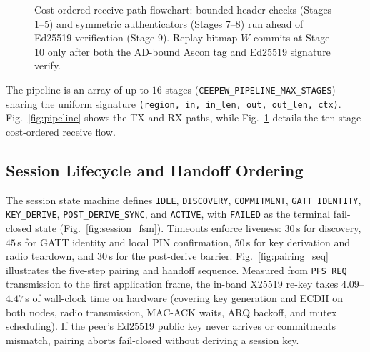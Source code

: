 \documentclass[conference]{IEEEtran}
\begin{document}
\begin{figure}[t]
{%
}
\caption{Cost-ordered receive-path flowchart: bounded header checks (Stages 1--5) and symmetric authenticators (Stages 7--8) run ahead of Ed25519 verification (Stage 9). Replay bitmap $W$ commits at Stage 10 only after both the AD-bound Ascon tag and Ed25519 signature verify.}
\label{fig:receive_path}
\end{figure}

The pipeline is an array of up to $16$ stages (\texttt{CEEPEW\_PIPELINE\_MAX\_STAGES}) sharing the uniform signature \texttt{(region, in, in\_len, out, out\_len, ctx)}. Fig.~\ref{fig:pipeline} shows the TX and RX paths, while Fig.~\ref{fig:receive_path} details the ten-stage cost-ordered receive flow.

\subsection{Session Lifecycle and Handoff Ordering}
The session state machine defines \texttt{IDLE}, \texttt{DISCOVERY}, \texttt{COMMITMENT}, \texttt{GATT\_IDENTITY}, \texttt{KEY\_DERIVE}, \texttt{POST\_DERIVE\_SYNC}, and \texttt{ACTIVE}, with \texttt{FAILED} as the terminal fail-closed state (Fig.~\ref{fig:session_fsm}). Timeouts enforce liveness: $30$\,s for discovery, $45$\,s for GATT identity and local PIN confirmation, $50$\,s for key derivation and radio teardown, and $30$\,s for the post-derive barrier. Fig.~\ref{fig:pairing_seq} illustrates the five-step pairing and handoff sequence. Measured from \texttt{PFS\_REQ} transmission to the first application frame, the in-band X25519 re-key takes $4.09$--$4.47$\,s of wall-clock time on hardware (covering key generation and ECDH on both nodes, radio transmission, MAC-ACK waits, ARQ backoff, and mutex scheduling). If the peer's Ed25519 public key never arrives or commitments mismatch, pairing aborts fail-closed without deriving a session key.
\end{document}
